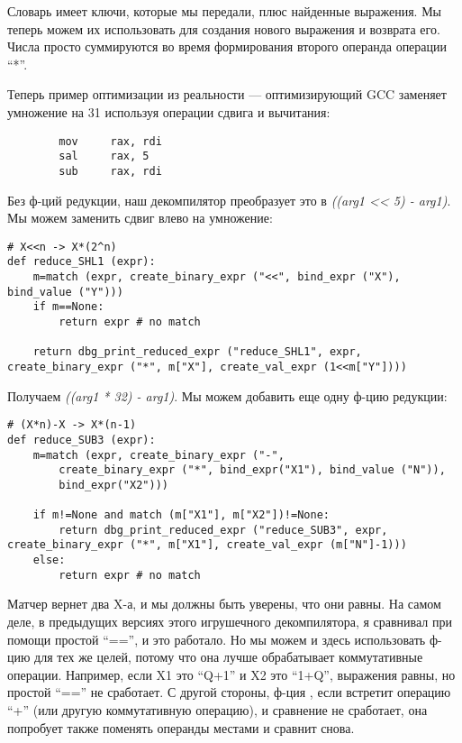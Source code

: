 Словарь имеет ключи, которые мы передали, плюс найденные выражения.
Мы теперь можем их использовать для создания нового выражения и возврата его.
Числа просто суммируются во время формирования второго операнда операции ``*''.

Теперь пример оптимизации из реальности --- оптимизирующий GCC заменяет умножение на 31 используя операции сдвига
и вычитания:

\begin{lstlisting}
        mov     rax, rdi
        sal     rax, 5
        sub     rax, rdi
\end{lstlisting}

Без ф-ций редукции, наш декомпилятор преобразует это в \textit{((arg1 << 5) - arg1)}.
Мы можем заменить сдвиг влево на умножение:

\begin{lstlisting}
# X<<n -> X*(2^n)
def reduce_SHL1 (expr):
    m=match (expr, create_binary_expr ("<<", bind_expr ("X"), bind_value ("Y")))
    if m==None:
        return expr # no match
    
    return dbg_print_reduced_expr ("reduce_SHL1", expr, create_binary_expr ("*", m["X"], create_val_expr (1<<m["Y"])))
\end{lstlisting}

Получаем \textit{((arg1 * 32) - arg1)}.
Мы можем добавить еще одну ф-цию редукции:

\begin{lstlisting}
# (X*n)-X -> X*(n-1)
def reduce_SUB3 (expr):
    m=match (expr, create_binary_expr ("-",
        create_binary_expr ("*", bind_expr("X1"), bind_value ("N")),
        bind_expr("X2")))
    
    if m!=None and match (m["X1"], m["X2"])!=None:
        return dbg_print_reduced_expr ("reduce_SUB3", expr, create_binary_expr ("*", m["X1"], create_val_expr (m["N"]-1)))
    else:
        return expr # no match
\end{lstlisting}

Матчер вернет два X-а, и мы должны быть уверены, что они равны.
На самом деле, в предыдущих версиях этого игрушечного декомпилятора, я сравнивал при помощи простой ``=='', и это работало.
Но мы можем и здесь использовать ф-цию  для тех же целей, потому что она лучше обрабатывает коммутативные операции.
Например, если X1 это ``Q+1'' и X2 это ``1+Q'', выражения равны, но простой ``=='' не сработает.
С другой стороны, ф-ция , если встретит операцию ``+'' (или другую коммутативную операцию),
и сравнение не сработает, она попробует также поменять операнды местами и сравнит снова.

